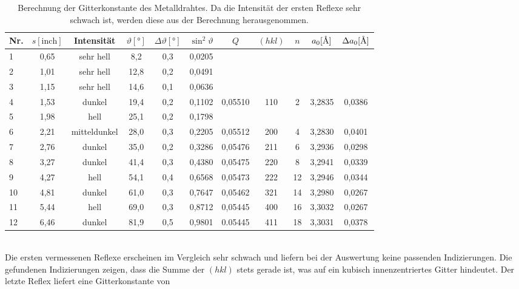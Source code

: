 \documentclass[a4paper,twoside,final]{article}
\begin{document}
\begin{table}[ht]
	\centering
	\caption{Berechnung der Gitterkonstante des Metalldrahtes. Da die Intensität der ersten Reflexe sehr schwach ist, werden diese aus der Berechnung herausgenommen.}
	\label{tab:Ergebnisse_Metalldraht}
	\begin{tabular}{l c c c c c | c c c c c}
		\toprule
      Nr. & $s [\text{inch}]$ & Intensität & $\vartheta [\si{\degree}]$ & $\Delta \vartheta [\si{\degree}]$ & $\sin^2 \vartheta $ & $Q$ & $(hkl)$ & $n$ & $a_0 [\si{\textup{\AA}}]$ & $\Delta a_0 [\si{\textup{\AA}}]$\\
    \midrule
    1  & 0,65 & sehr hell    & 8,2  & 0,3 & 0,0205 &         &     &    &        &        \\
    2  & 1,01 & sehr hell    & 12,8 & 0,2 & 0,0491 &         &     &    &        &        \\
    3  & 1,15 & sehr hell    & 14,6 & 0,1 & 0,0636 &         &     &    &        &        \\
    4  & 1,53 & dunkel       & 19,4 & 0,2 & 0,1102 & 0,05510 & 110 & 2  & 3,2835 & 0,0386 \\
    5  & 1,98 & hell         & 25,1 & 0,2 & 0,1798 &         &     &    &        &        \\
    6  & 2,21 & mitteldunkel & 28,0 & 0,3 & 0,2205 & 0,05512 & 200 & 4  & 3,2830 & 0,0401 \\
    7  & 2,76 & dunkel       & 35,0 & 0,2 & 0,3286 & 0,05476 & 211 & 6  & 3,2936 & 0,0298 \\
    8  & 3,27 & dunkel       & 41,4 & 0,3 & 0,4380 & 0,05475 & 220 & 8  & 3,2941 & 0,0339 \\
    9  & 4,27 & hell         & 54,1 & 0,4 & 0,6568 & 0,05473 & 222 & 12 & 3,2946 & 0,0344 \\
    10 & 4,81 & dunkel       & 61,0 & 0,3 & 0,7647 & 0,05462 & 321 & 14 & 3,2980 & 0,0267 \\
    11 & 5,44 & hell         & 69,0 & 0,3 & 0,8712 & 0,05445 & 400 & 16 & 3,3032 & 0,0267 \\
    12 & 6,46 & dunkel       & 81,9 & 0,5 & 0,9801 & 0.05445 & 411 & 18 & 3,3031 & 0,0378
	\end{tabular}
\end{table}\\
Die ersten vermessenen Reflexe erscheinen im Vergleich sehr schwach und liefern bei der Auswertung keine passenden Indizierungen. Die gefundenen Indizierungen zeigen, dass die Summe der $(hkl)$ stets gerade ist, was auf ein kubisch innenzentriertes Gitter hindeutet. Der letzte Reflex liefert eine Gitterkonstante von
\end{document}
